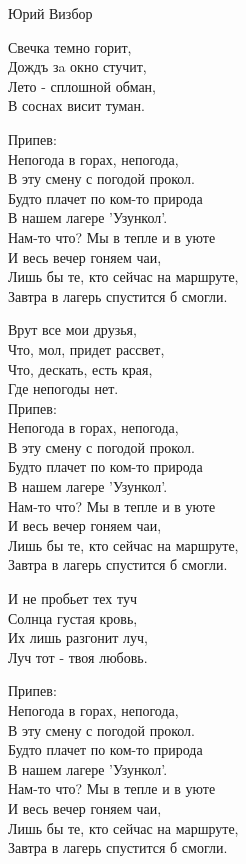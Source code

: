 {Юрий Визбор}
\begin{text}
Свечка темно горит,\\
Дождъ зa окно стучит,\\
Лето - сплошной обман,\\
В соснах висит туман.

Припев:\\
Непогода в горах, непогода,\\
В эту смену с погодой прокол.\\
Будто плачет по ком-то природа\\
В нашем лагере 'Узункол'.\\
Нам-то что? Мы в тепле и в уюте\\
И весь вечер гоняем чаи,\\
Лишь бы те, кто сейчас на маршруте,\\
Завтра в лагерь спустится б смогли.

Врут все мои друзья,\\
Что, мол, придет рассвет,\\
Что, дескать, есть края,\\
Где непогоды нет.\\

Припев:\\
Непогода в горах, непогода,\\
В эту смену с погодой прокол.\\
Будто плачет по ком-то природа\\
В нашем лагере 'Узункол'.\\
Нам-то что? Мы в тепле и в уюте\\
И весь вечер гоняем чаи,\\
Лишь бы те, кто сейчас на маршруте,\\
Завтра в лагерь спустится б смогли.

И не пробьет тех туч\\
Солнца густая кровь,\\
Их лишь разгонит луч,\\
Луч тот - твоя любовь.

Припев:\\
Непогода в горах, непогода,\\
В эту смену с погодой прокол.\\
Будто плачет по ком-то природа\\
В нашем лагере 'Узункол'.\\
Нам-то что? Мы в тепле и в уюте\\
И весь вечер гоняем чаи,\\
Лишь бы те, кто сейчас на маршруте,\\
Завтра в лагерь спустится б смогли.
\end{text}
